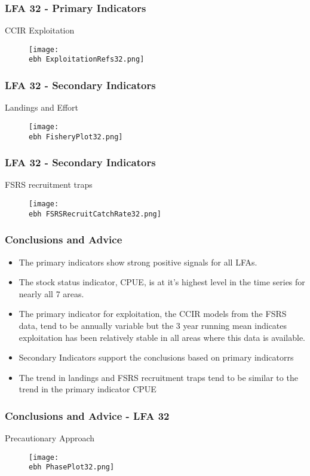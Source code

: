 \documentclass{beamer}
\newcommand{\ebh}{\string~/bio.data/bio.lobster/figures/Assessment/LFA2732/} %
\begin{document}
\begin{frame}
\frametitle{LFA 32 - Primary Indicators}
CCIR Exploitation 
\begin{figure}
        \begin{center}
            \texttt{[image: \\ebh ExploitationRefs32.png]}
        \end{center}
    \end{figure}
\end{frame}




\begin{frame}
\frametitle{LFA 32 - Secondary Indicators}
Landings and Effort
\begin{figure}
        \begin{center}
            \texttt{[image: \\ebh FisheryPlot32.png]}
        \end{center}
    \end{figure}
\end{frame}



\begin{frame}
\frametitle{LFA 32 - Secondary Indicators}
FSRS recruitment traps
\begin{figure}
        \begin{center}
            \texttt{[image: \\ebh FSRSRecruitCatchRate32.png]}
        \end{center}
    \end{figure}
\end{frame}





\begin{frame}
\frametitle{Conclusions and Advice}
\begin{itemize}

\item The primary indicators show strong positive signals for all LFAs. 
\item The stock status indicator, CPUE, is at it’s highest level in the time series for nearly all 7 areas. 
\item The primary indicator for exploitation, the CCIR models from the FSRS data, tend to be annually variable but the 3 year running mean indicates exploitation has been relatively stable in all areas where this data is available. 
\item Secondary Indicators support the conclusions based on primary indicatorrs
\item The trend in landings and FSRS recruitment traps tend to be similar to the trend in the primary indicator CPUE
\end{itemize}
\end{frame}




\begin{frame}
\frametitle{Conclusions and Advice - LFA 32}
Precautionary Approach
\begin{figure}
        \begin{center}
            \texttt{[image: \\ebh PhasePlot32.png]}
        \end{center}
    \end{figure}
\end{frame}
\end{document}
